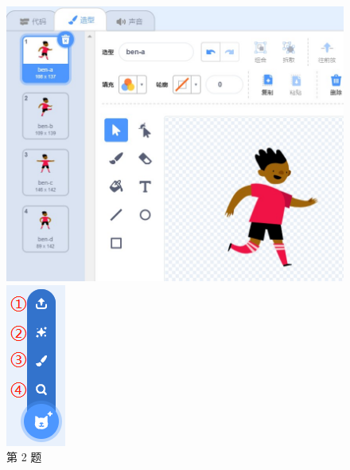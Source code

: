 \documentclass[10pt, a4paper]{article}
\begin{document}
\begin{enumerate}
        \begin{figure}[htbp]
            \centering
            \begin{minipage}[t]{.15\textwidth}
                \centering
                \includegraphics[width=\textwidth]{2.jpg}
                \caption*{第 2 题}
            \end{minipage}
            \begin{minipage}[t]{.1\textwidth}
                \centering
                \includegraphics[width=.45\textwidth]{3.png}

\end{minipage}
\end{figure}
\end{enumerate}
\end{document}
